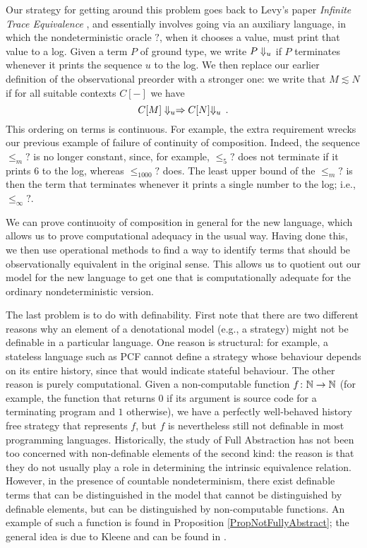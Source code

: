 Our strategy for getting around this problem goes back to Levy's paper \emph{Infinite Trace Equivalence} \cite{LevyGsInfinite}, and essentially involves going via an auxiliary language, in which the nondeterministic oracle $?$, when it chooses a value, must print that value to a log.  
Given a term $P$ of ground type, we write $P\Downarrow_u$ if $P$ terminates whenever it prints the sequence $u$ to the log.  
We then replace our earlier definition of the observational preorder with a stronger one: we write that $M\lesssim N$ if for all suitable contexts $C[-]$ we have
\[
  C[M] \Downarrow_u \mathrel{\Rightarrow C[N]} \Downarrow_u\,.
  \]
This ordering on terms is continuous.
For example, the extra requirement wrecks our previous example of failure of continuity of composition.  
Indeed, the sequence $\le_m ?$ is no longer constant, since, for example, $\le_5 ?$ does not terminate if it prints $6$ to the log, whereas $\le_{1000} ?$ does.
The least upper bound of the $\le_m?$ is then the term that terminates whenever it prints a single number to the log; i.e., $\le_\infty ?$.

We can prove continuoity of composition in general for the new language, which allows us to prove computational adequacy in the usual way.
Having done this, we then use operational methods to find a way to identify terms that should be observationally equivalent in the original sense.  
This allows us to quotient out our model for the new language to get one that is computationally adequate for the ordinary nondeterministic version.

The last problem is to do with definability.
First note that there are two different reasons why an element of a denotational model (e.g., a strategy) might not be definable in a particular language.  
One reason is structural: for example, a stateless language such as PCF cannot define a strategy whose behaviour depends on its entire history, since that would indicate stateful behaviour.  
The other reason is purely computational.  
Given a non-computable function $f\colon \mathbb{N} \to \mathbb{N}$ (for example, the function that returns $0$ if its argument is source code for a terminating program and $1$ otherwise), we have a perfectly well-behaved history free strategy that represents $f$, but $f$ is nevertheless still not definable in most programming languages.  
Historically, the study of Full Abstraction has not been too concerned with non-definable elements of the second kind: the reason is that they do not usually play a role in determining the intrinsic equivalence relation.
However, in the presence of countable nondeterminism, there exist definable terms that can be distinguished in the model that cannot be distinguished by definable elements, but can be distinguished by non-computable functions.
An example of such a function is found in Proposition \ref{PropNotFullyAbstract}; the general idea is due to Kleene and can be found in \cite{KleeneTree}.

